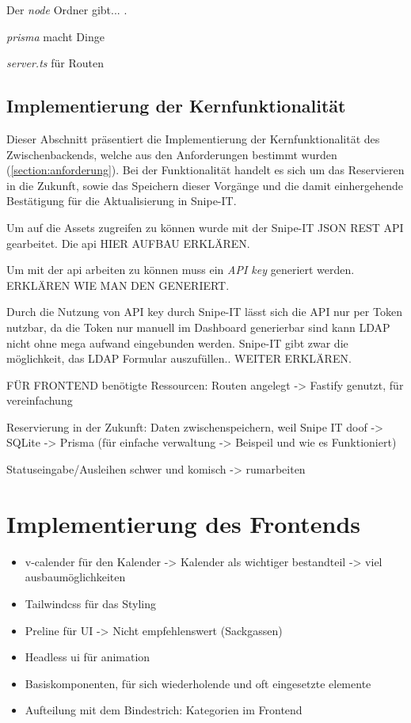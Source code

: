 Der \textit{node} Ordner gibt... .

\textit{prisma} macht Dinge 

\textit{server.ts} für Routen

\subsection{Implementierung der Kernfunktionalität}
Dieser Abschnitt präsentiert die Implementierung der Kernfunktionalität des Zwischenbackends,
welche aus den Anforderungen  bestimmt wurden (\ref{section:anforderung}). Bei der Funktionalität
handelt es sich um das Reservieren in die Zukunft, sowie das Speichern dieser Vorgänge und die
damit einhergehende Bestätigung für die Aktualisierung in Snipe-IT.

Um auf die Assets zugreifen zu können wurde mit der Snipe-IT JSON REST API gearbeitet. 
Die api HIER AUFBAU ERKLÄREN.

Um mit der api arbeiten zu können muss ein \textit{API key} generiert werden. ERKLÄREN WIE MAN DEN
GENERIERT.

Durch die Nutzung von API key durch Snipe-IT lässt sich die  API nur per Token nutzbar, da die Token
nur manuell im Dashboard generierbar sind kann LDAP nicht ohne mega aufwand eingebunden werden.
Snipe-IT gibt zwar die möglichkeit, das LDAP Formular auszufüllen.. WEITER ERKLÄREN.


FÜR FRONTEND benötigte Ressourcen: Routen angelegt -> Fastify genutzt, für vereinfachung


Reservierung in der Zukunft: Daten zwischenspeichern, weil Snipe IT doof -> SQLite -> Prisma
  (für einfache verwaltung -> Beispeil und wie es Funktioniert) 


Statuseingabe/Ausleihen schwer und komisch -> rumarbeiten

\section{Implementierung des Frontends}
\begin{itemize}
  \item v-calender für den Kalender -> Kalender als wichtiger bestandteil -> viel ausbaumöglichkeiten
  \item Tailwindcss für das Styling
  \item Preline für UI -> Nicht empfehlenswert (Sackgassen)
  \item Headless ui für animation
  \item Basiskomponenten, für sich wiederholende und oft eingesetzte elemente
  \item Aufteilung mit dem Bindestrich: Kategorien im Frontend
\end{itemize}



